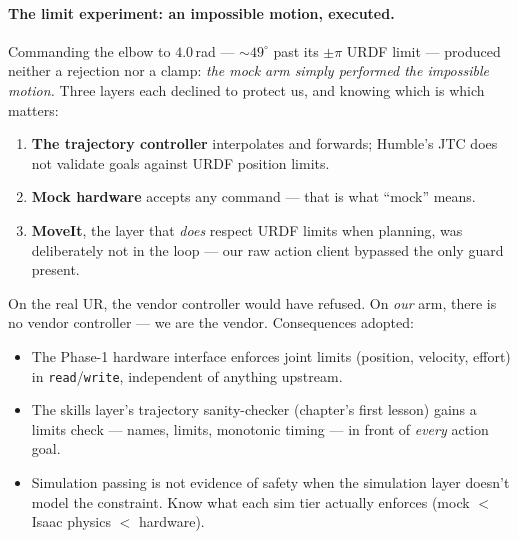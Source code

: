 \paragraph{The limit experiment: an impossible motion, executed.} Commanding the elbow to
$4.0$\,rad --- ${\sim}49^\circ$ past its $\pm\pi$ URDF limit --- produced neither a rejection
nor a clamp: \emph{the mock arm simply performed the impossible motion.} Three layers each
declined to protect us, and knowing which is which matters:
\begin{enumerate}
  \item \textbf{The trajectory controller} interpolates and forwards; Humble's JTC does not
  validate goals against URDF position limits.
  \item \textbf{Mock hardware} accepts any command --- that is what ``mock'' means.
  \item \textbf{MoveIt}, the layer that \emph{does} respect URDF limits when planning, was
  deliberately not in the loop --- our raw action client bypassed the only guard present.
\end{enumerate}
On the real UR, the vendor controller would have refused. On \emph{our} arm, there is no
vendor controller --- we are the vendor. Consequences adopted:
\begin{itemize}
  \item The Phase-1 hardware interface enforces joint limits (position, velocity, effort) in
  \texttt{read}/\texttt{write}, independent of anything upstream.
  \item The skills layer's trajectory sanity-checker (chapter's first lesson) gains a
  limits check --- names, limits, monotonic timing --- in front of \emph{every} action goal.
  \item Simulation passing is not evidence of safety when the simulation layer doesn't model
  the constraint. Know what each sim tier actually enforces (mock $<$ Isaac physics $<$
  hardware).
\end{itemize}

